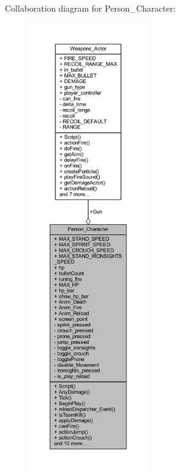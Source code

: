 Collaboration diagram for Person\+\_\+\+Character\+:
\nopagebreak
\begin{figure}[H]
\begin{center}
\leavevmode
\includegraphics[height=550pt]{class_person___character__coll__graph}
\end{center}
\end{figure}
